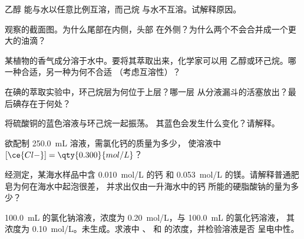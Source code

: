 \begin{exercise}[$\star\star$]\label{exo:g11:dissolution:7}
乙醇  能与水以任意比例互溶，而己烷
 与水不互溶。试解释原因。
\end{exercise}

\begin{exercise}[$\star\star$]\label{exo:g11:dissolution:8}
观察的截面图。为什么尾部在内侧，头部
在外侧？为什么两个不会合并成一个更大的油滴？
\end{exercise}

\begin{exercise}[$\star\star$]\label{exo:g11:dissolution:9}
某植物的香气成分溶于水中。要将其萃取出来，化学家可以用
乙醇或环己烷。哪一种合适，另一种为何不合适
（考虑互溶性）？
\end{exercise}

\begin{exercise}[$\star\star$]\label{exo:g11:dissolution:10}
在碘的萃取实验中，环己烷层为何位于上层？哪一层
从分液漏斗的活塞放出？最后碘存在于何处？
\end{exercise}

\begin{exercise}[$\star\star$]\label{exo:g11:dissolution:11}
将硫酸铜的蓝色溶液与环己烷一起振荡。
其蓝色会发生什么变化？请解释。
\end{exercise}

\begin{exercise}[$\star\star\star$]\label{exo:g11:dissolution:12}
欲配制 \qty{250.0}{mL} 溶液，需氯化钙的质量为多少，
使溶液中 $[\ce{Cl-}] = \qty{0.300}{mol/L}$？
\end{exercise}

\begin{exercise}[$\star\star\star$]\label{exo:g11:dissolution:13}
经测定，某海水样品中含 \qty{0.010}{mol/L} 的钙
和 \qty{0.053}{mol/L} 的镁。请解释普通肥皂为何在海水中起泡很差，
并求出仅由一升海水中的钙
所能的硬脂酸钠的量为多少？
\end{exercise}

\begin{exercise}[$\star\star\star$]\label{exo:g11:dissolution:14}
\qty{100.0}{mL} 的氯化钠溶液，浓度为
\qty{0.20}{mol/L}，与 \qty{100.0}{mL} 的氯化钙溶液，
其浓度为 \qty{0.10}{mol/L}。未生成。求液中
、 和  的浓度，并检验溶液是否
呈电中性。
\end{exercise}

